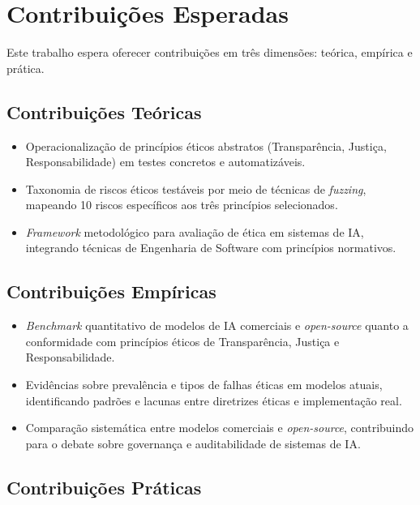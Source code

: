 \section{Contribuições Esperadas}

Este trabalho espera oferecer contribuições em três dimensões: teórica, empírica e prática.

\subsection{Contribuições Teóricas}

\begin{itemize}
    \item Operacionalização de princípios éticos abstratos (Transparência, Justiça, Responsabilidade) em testes concretos e automatizáveis.
    \item Taxonomia de riscos éticos testáveis por meio de técnicas de \textit{fuzzing}, mapeando 10 riscos específicos aos três princípios selecionados.
    \item \textit{Framework} metodológico para avaliação de ética em sistemas de IA, integrando técnicas de Engenharia de Software com princípios normativos.
\end{itemize}

\subsection{Contribuições Empíricas}

\begin{itemize}
    \item \textit{Benchmark} quantitativo de modelos de IA comerciais e \textit{open-source} quanto a conformidade com princípios éticos de Transparência, Justiça e Responsabilidade.
    \item Evidências sobre prevalência e tipos de falhas éticas em modelos atuais, identificando padrões e lacunas entre diretrizes éticas e implementação real.
    \item Comparação sistemática entre modelos comerciais e \textit{open-source}, contribuindo para o debate sobre governança e auditabilidade de sistemas de IA.
\end{itemize}

\subsection{Contribuições Práticas}

